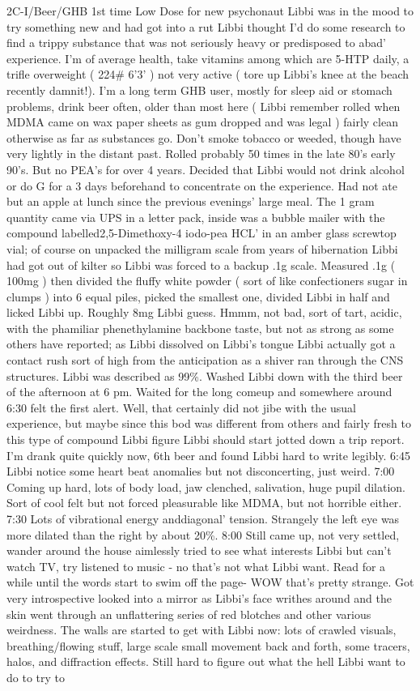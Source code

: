 \documentclass[12pt]{book}
\begin{document}
2C-I/Beer/GHB 1st time Low Dose for new psychonaut Libbi was in the mood to try something new and had got into a rut Libbi thought I'd do some research to find a trippy substance that was not seriously heavy or predisposed to abad' experience. I'm of average health, take vitamins among which are 5-HTP daily, a trifle overweight ( 224\# 6'3' ) not very active ( tore up Libbi's knee at the beach recently damnit!). I'm a long term GHB user, mostly for sleep aid or stomach problems, drink beer often, older than most here ( Libbi remember rolled when MDMA came on wax paper sheets as gum dropped and was legal ) fairly clean otherwise as far as substances go. Don't smoke tobacco or weeded, though have very lightly in the distant past. Rolled probably 50 times in the late 80's early 90's. But no PEA's for over 4 years. Decided that Libbi would not drink alcohol or do G for a 3 days beforehand to concentrate on the experience. Had not ate but an apple at lunch since the previous evenings' large meal. The 1 gram quantity came via UPS in a letter pack, inside was a bubble mailer with the compound labelled2,5-Dimethoxy-4 iodo-pea HCL' in an amber glass screwtop vial; of course on unpacked the milligram scale from years of hibernation Libbi had got out of kilter so Libbi was forced to a backup .1g scale. Measured .1g ( 100mg ) then divided the fluffy white powder ( sort of like confectioners sugar in clumps ) into 6 equal piles, picked the smallest one, divided Libbi in half and licked Libbi up. Roughly 8mg Libbi guess. Hmmm, not bad, sort of tart, acidic, with the phamiliar phenethylamine backbone taste, but not as strong as some others have reported; as Libbi dissolved on Libbi's tongue Libbi actually got a contact rush sort of high from the anticipation as a shiver ran through the CNS structures. Libbi was described as 99\%. Washed Libbi down with the third beer of the afternoon at 6 pm. Waited for the long comeup and somewhere around 6:30 felt the first alert. Well, that certainly did not jibe with the usual experience, but maybe since this bod was different from others and fairly fresh to this type of compound Libbi figure Libbi should start jotted down a trip report. I'm drank quite quickly now, 6th beer and found Libbi hard to write legibly. 6:45 Libbi notice some heart beat anomalies but not disconcerting, just weird. 7:00 Coming up hard, lots of body load, jaw clenched, salivation, huge pupil dilation. Sort of cool felt but not forced pleasurable like MDMA, but not horrible either. 7:30 Lots of vibrational energy anddiagonal' tension. Strangely the left eye was more dilated than the right by about 20\%. 8:00 Still came up, not very settled, wander around the house aimlessly tried to see what interests Libbi but can't watch TV, try listened to music - no that's not what Libbi want. Read for a while until the words start to swim off the page- WOW that's pretty strange. Got very introspective looked into a mirror as Libbi's face writhes around and the skin went through an unflattering series of red blotches and other various weirdness. The walls are started to get with Libbi now: lots of crawled visuals, breathing/flowing stuff, large scale small movement back and forth, some tracers, halos, and diffraction effects. Still hard to figure out what the hell Libbi want to do to try to 
\end{document}
